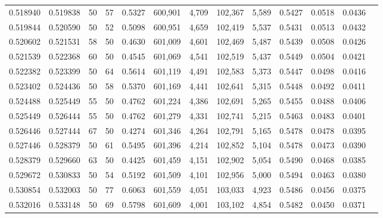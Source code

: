 \begin{tabular}{rrrrrrrrrrrrr}
0.518940 & 0.519838 &    50 &  57 &                                     0.5327 & 600,901 &   4,709 & 102,367 &   5,589 & 0.5427 & 0.0518 & 0.0436 \\
0.519844 & 0.520590 &    50 &  52 &                                     0.5098 & 600,951 &   4,659 & 102,419 &   5,537 & 0.5431 & 0.0513 & 0.0432 \\
0.520602 & 0.521531 &    58 &  50 &                                     0.4630 & 601,009 &   4,601 & 102,469 &   5,487 & 0.5439 & 0.0508 & 0.0426 \\
0.521539 & 0.522368 &    60 &  50 &                                     0.4545 & 601,069 &   4,541 & 102,519 &   5,437 & 0.5449 & 0.0504 & 0.0421 \\
0.522382 & 0.523399 &    50 &  64 &                                     0.5614 & 601,119 &   4,491 & 102,583 &   5,373 & 0.5447 & 0.0498 & 0.0416 \\
0.523402 & 0.524436 &    50 &  58 &                                     0.5370 & 601,169 &   4,441 & 102,641 &   5,315 & 0.5448 & 0.0492 & 0.0411 \\
0.524488 & 0.525449 &    55 &  50 &                                     0.4762 & 601,224 &   4,386 & 102,691 &   5,265 & 0.5455 & 0.0488 & 0.0406 \\
0.525449 & 0.526444 &    55 &  50 &                                     0.4762 & 601,279 &   4,331 & 102,741 &   5,215 & 0.5463 & 0.0483 & 0.0401 \\
0.526446 & 0.527444 &    67 &  50 &                                     0.4274 & 601,346 &   4,264 & 102,791 &   5,165 & 0.5478 & 0.0478 & 0.0395 \\
0.527446 & 0.528379 &    50 &  61 &                                     0.5495 & 601,396 &   4,214 & 102,852 &   5,104 & 0.5478 & 0.0473 & 0.0390 \\
0.528379 & 0.529660 &    63 &  50 &                                     0.4425 & 601,459 &   4,151 & 102,902 &   5,054 & 0.5490 & 0.0468 & 0.0385 \\
0.529672 & 0.530833 &    50 &  54 &                                     0.5192 & 601,509 &   4,101 & 102,956 &   5,000 & 0.5494 & 0.0463 & 0.0380 \\
0.530854 & 0.532003 &    50 &  77 &                                     0.6063 & 601,559 &   4,051 & 103,033 &   4,923 & 0.5486 & 0.0456 & 0.0375 \\
0.532016 & 0.533148 &    50 &  69 &                                     0.5798 & 601,609 &   4,001 & 103,102 &   4,854 & 0.5482 & 0.0450 & 0.0371 \\

\end{tabular}
